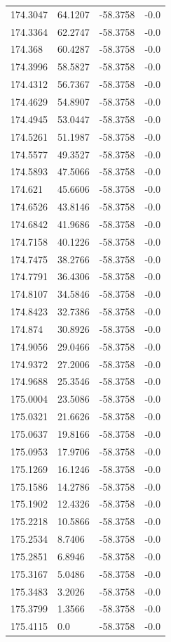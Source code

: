 \begin{table}[H]
\begin{tabular}{llll}
174.3047 & 64.1207 & -58.3758 & -0.0 \\
174.3364 & 62.2747 & -58.3758 & -0.0 \\
174.368 & 60.4287 & -58.3758 & -0.0 \\
174.3996 & 58.5827 & -58.3758 & -0.0 \\
174.4312 & 56.7367 & -58.3758 & -0.0 \\
174.4629 & 54.8907 & -58.3758 & -0.0 \\
174.4945 & 53.0447 & -58.3758 & -0.0 \\
174.5261 & 51.1987 & -58.3758 & -0.0 \\
174.5577 & 49.3527 & -58.3758 & -0.0 \\
174.5893 & 47.5066 & -58.3758 & -0.0 \\
174.621 & 45.6606 & -58.3758 & -0.0 \\
174.6526 & 43.8146 & -58.3758 & -0.0 \\
174.6842 & 41.9686 & -58.3758 & -0.0 \\
174.7158 & 40.1226 & -58.3758 & -0.0 \\
174.7475 & 38.2766 & -58.3758 & -0.0 \\
174.7791 & 36.4306 & -58.3758 & -0.0 \\
174.8107 & 34.5846 & -58.3758 & -0.0 \\
174.8423 & 32.7386 & -58.3758 & -0.0 \\
174.874 & 30.8926 & -58.3758 & -0.0 \\
174.9056 & 29.0466 & -58.3758 & -0.0 \\
174.9372 & 27.2006 & -58.3758 & -0.0 \\
174.9688 & 25.3546 & -58.3758 & -0.0 \\
175.0004 & 23.5086 & -58.3758 & -0.0 \\
175.0321 & 21.6626 & -58.3758 & -0.0 \\
175.0637 & 19.8166 & -58.3758 & -0.0 \\
175.0953 & 17.9706 & -58.3758 & -0.0 \\
175.1269 & 16.1246 & -58.3758 & -0.0 \\
175.1586 & 14.2786 & -58.3758 & -0.0 \\
175.1902 & 12.4326 & -58.3758 & -0.0 \\
175.2218 & 10.5866 & -58.3758 & -0.0 \\
175.2534 & 8.7406 & -58.3758 & -0.0 \\
175.2851 & 6.8946 & -58.3758 & -0.0 \\
175.3167 & 5.0486 & -58.3758 & -0.0 \\
175.3483 & 3.2026 & -58.3758 & -0.0 \\
175.3799 & 1.3566 & -58.3758 & -0.0 \\
175.4115 & 0.0 & -58.3758 & -0.0 \\
\bottomrule
\end{tabular}

\end{table}
